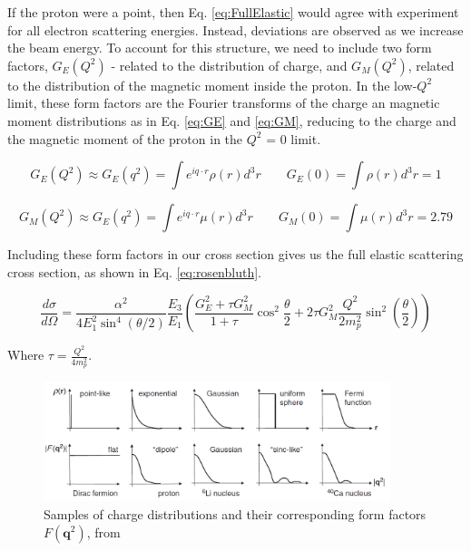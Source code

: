             \indent If the proton were a point, then Eq. \ref{eq:FullElastic} would agree with experiment for all electron scattering energies. Instead, deviations are observed as we increase the beam energy. To account for this structure, we need to include two form factors, $G_E(Q^2)$ - related to the distribution of charge, and $G_M(Q^2)$, related to the distribution of the magnetic moment inside the proton. In the low-$Q^2$ limit, these form factors are the Fourier transforms of the charge an magnetic moment distributions as in Eq. \ref{eq:GE} and \ref{eq:GM}, reducing to the charge and the magnetic moment of the proton in the $Q^2$ = 0 limit. %

        \begin{equation}\label{eq:GE}
             G_E(Q^2) \approx G_E(q^2) = \int e^{iq\cdot r} \rho (r) d^3r  \quad \quad   G_E(0) = \int  \rho (r) d^3r = 1
        \end{equation}

        \begin{equation}\label{eq:GM}
             G_M(Q^2) \approx G_E(q^2) = \int e^{iq\cdot r} \mu (r) d^3r  \quad \quad   G_M(0) = \int  \mu (r) d^3r = 2.79
        \end{equation}
        
        
        Including these form factors in our cross section gives us the full elastic scattering cross section, as shown in Eq. \ref{eq:rosenbluth}.
                
        \begin{equation}\label{eq:rosenbluth}
            \frac{d\sigma}{d\Omega} = \frac{\alpha^2}{4E_1^2\sin^4{(\theta/2)}}\frac{E_3}{E_1}\left( \frac{G_E^2+\tau G_M^2}{1+\tau} \cos^2{\frac{\theta}{2}}+2\tau G_M^2\frac{Q^2}{2m_p^2}\sin^2(\frac{\theta}{2})\right)
        \end{equation}
       
        Where $\tau = \frac{Q^2}{4m_p^2}$.
        

        \begin{figure}[H]\label{fig:formfactors}
            \centering
            \includegraphics[width=0.9\textwidth]{Chapters/Ch1-Intro/Ch1-Sec1-Background/pics/intro/possibleformfactors.png}
            \caption[Fourier Transforms of Charge Distributions]{Samples of charge distributions and their corresponding form factors $F(\textbf{q}^2)$, from \cite{Thomson2013ModernPhysics} }
        \end{figure}
        

